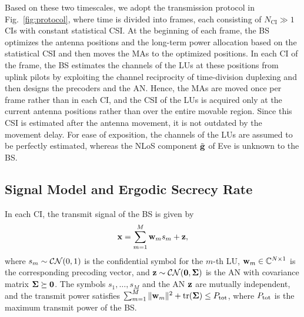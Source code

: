 \documentclass[journal]{IEEEtran}
\begin{document}
Based on these two timescales, we adopt the transmission protocol in Fig.~\ref{fig:protocol}, where time is divided into frames, each consisting of $N_{\mathrm{CI}}\gg1$ CIs with constant statistical CSI. At the beginning of each frame, the BS optimizes the antenna positions and the long-term power allocation based on the statistical CSI and then moves the MAs to the optimized positions. In each CI of the frame, the BS estimates the channels of the LUs at these positions from uplink pilots by exploiting the channel reciprocity of time-division duplexing and then designs the precoders and the AN. Hence, the MAs are moved once per frame rather than in each CI, and the CSI of the LUs is acquired only at the current antenna positions rather than over the entire movable region. Since this CSI is estimated after the antenna movement, it is not outdated by the movement delay. For ease of exposition, the channels of the LUs are assumed to be perfectly estimated, whereas the NLoS component $\tilde{\mathbf{g}}$ of Eve is unknown to the BS.

\subsection{Signal Model and Ergodic Secrecy Rate}

In each CI, the transmit signal of the BS is given by
\begin{equation}\label{eq:x}
\mathbf{x}=\sum_{m=1}^{M}\mathbf{w}_m s_m+\mathbf{z},
\end{equation}
where $s_m\sim\mathcal{CN}(0,1)$ is the confidential symbol for the $m$-th LU, $\mathbf{w}_m\in\mathbb C^{N\times1}$ is the corresponding precoding vector, and $\mathbf{z}\sim\mathcal{CN}(\mathbf 0,\boldsymbol{\Sigma})$ is the AN with covariance matrix $\boldsymbol{\Sigma}\succeq\mathbf 0$. The symbols $s_1,\ldots,s_M$ and the AN $\mathbf{z}$ are mutually independent, and the transmit power satisfies $\sum_{m=1}^M\|\mathbf{w}_m\|^2+\mathrm{tr}(\boldsymbol{\Sigma})\le P_{\mathrm{tot}}$, where $P_{\mathrm{tot}}$ is the maximum transmit power of the BS.
\end{document}
